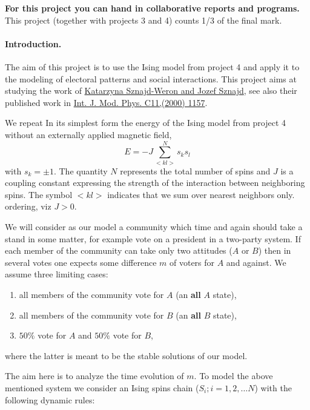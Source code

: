 \documentclass[%
oneside,                 %
final,                   %
10pt]{article}
\begin{document}
\textbf{For this project you can hand in collaborative reports and programs.}
This project (together with projects 3 and 4) counts 1/3 of the final mark.



\paragraph{Introduction.}
The aim of this project is to use the Ising model from project 4 and 
apply it to the modeling of electoral patterns and social interactions.
This project aims at studying the work of \href{{https://arxiv.org/abs/cond-mat/0101130}}{Katarzyna Sznajd-Weron and
Jozef Sznajd}, see also their
published work in \href{{https://www.worldscientific.com/doi/abs/10.1142/S0129183100000936}}{Int. J. Mod. Phys. C11,(2000) 1157}. 


We repeat 
In its simplest form
the energy of the Ising model from project 4 without an externally applied magnetic field, 
\[
E=-J\sum_{< kl >}^{N}s_ks_l 
\]
with
$s_k=\pm 1$. The quantity $N$ represents the total number of spins and $J$ is a coupling
constant expressing the strength of the interaction between
neighboring spins.  The symbol $<kl>$ indicates that we sum over
nearest neighbors only. 
ordering, viz $J> 0$.  

We will  consider as our model a community which time and again should
take a stand in some matter, for example vote on a president in
a two-party system. If each member of the
community can take only two attitudes ($A$ or $B$) then in several
votes one expects some difference $m$ of voters for $A$ and against.
We assume three limiting cases:

\begin{enumerate}
\item all members of the community vote for $A$ (an \textbf{all} $A$ state),

\item all members of the community vote for $B$ (an \textbf{all} $B$ state),

\item $50\%$ vote for $A$ and $50\%$ vote for $B$,
\end{enumerate}

\noindent
where the latter is meant to  be the stable solutions of our model.

The aim here is to analyze the time evolution of $m$. To model the
above mentioned system we consider an Ising spins chain
($S_i;i=1,2,\ldots N$) with the following dynamic rules:
\end{document}
